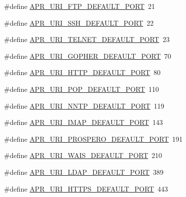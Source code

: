 \begin{DoxyCompactItemize}
\item 
\#define \hyperlink{group___a_p_r___util___u_r_i_ga0134a6dcaf62796e014c592ac4b2c09c}{A\-P\-R\-\_\-\-U\-R\-I\-\_\-\-F\-T\-P\-\_\-\-D\-E\-F\-A\-U\-L\-T\-\_\-\-P\-O\-R\-T}~21
\item 
\#define \hyperlink{group___a_p_r___util___u_r_i_ga4f4161d54207cf302b3c91cdda428be1}{A\-P\-R\-\_\-\-U\-R\-I\-\_\-\-S\-S\-H\-\_\-\-D\-E\-F\-A\-U\-L\-T\-\_\-\-P\-O\-R\-T}~22
\item 
\#define \hyperlink{group___a_p_r___util___u_r_i_ga0b6bcdfb9754edd6c160c9d6755df085}{A\-P\-R\-\_\-\-U\-R\-I\-\_\-\-T\-E\-L\-N\-E\-T\-\_\-\-D\-E\-F\-A\-U\-L\-T\-\_\-\-P\-O\-R\-T}~23
\item 
\#define \hyperlink{group___a_p_r___util___u_r_i_gaaf5bb1e53b22fa7ac4e88f415e7c2476}{A\-P\-R\-\_\-\-U\-R\-I\-\_\-\-G\-O\-P\-H\-E\-R\-\_\-\-D\-E\-F\-A\-U\-L\-T\-\_\-\-P\-O\-R\-T}~70
\item 
\#define \hyperlink{group___a_p_r___util___u_r_i_ga7a9fa7be10430864617b3a0a58dd5d12}{A\-P\-R\-\_\-\-U\-R\-I\-\_\-\-H\-T\-T\-P\-\_\-\-D\-E\-F\-A\-U\-L\-T\-\_\-\-P\-O\-R\-T}~80
\item 
\#define \hyperlink{group___a_p_r___util___u_r_i_gaf9408c6288a8580b285d7af58f836856}{A\-P\-R\-\_\-\-U\-R\-I\-\_\-\-P\-O\-P\-\_\-\-D\-E\-F\-A\-U\-L\-T\-\_\-\-P\-O\-R\-T}~110
\item 
\#define \hyperlink{group___a_p_r___util___u_r_i_ga86ac4da6cabda295f87042fb258fc36b}{A\-P\-R\-\_\-\-U\-R\-I\-\_\-\-N\-N\-T\-P\-\_\-\-D\-E\-F\-A\-U\-L\-T\-\_\-\-P\-O\-R\-T}~119
\item 
\#define \hyperlink{group___a_p_r___util___u_r_i_ga6e8aade3786adb75dc63b9d0bd3bfbb9}{A\-P\-R\-\_\-\-U\-R\-I\-\_\-\-I\-M\-A\-P\-\_\-\-D\-E\-F\-A\-U\-L\-T\-\_\-\-P\-O\-R\-T}~143
\item 
\#define \hyperlink{group___a_p_r___util___u_r_i_ga329c26e04dd9449fd565f8ba76e8666c}{A\-P\-R\-\_\-\-U\-R\-I\-\_\-\-P\-R\-O\-S\-P\-E\-R\-O\-\_\-\-D\-E\-F\-A\-U\-L\-T\-\_\-\-P\-O\-R\-T}~191
\item 
\#define \hyperlink{group___a_p_r___util___u_r_i_ga0807570c6ef5c3813f65915fb0c19ff2}{A\-P\-R\-\_\-\-U\-R\-I\-\_\-\-W\-A\-I\-S\-\_\-\-D\-E\-F\-A\-U\-L\-T\-\_\-\-P\-O\-R\-T}~210
\item 
\#define \hyperlink{group___a_p_r___util___u_r_i_ga5c648234ed92d19a09232080779a0185}{A\-P\-R\-\_\-\-U\-R\-I\-\_\-\-L\-D\-A\-P\-\_\-\-D\-E\-F\-A\-U\-L\-T\-\_\-\-P\-O\-R\-T}~389
\item 
\#define \hyperlink{group___a_p_r___util___u_r_i_ga9b319ff3bda42c0384fcfe0a2bc53254}{A\-P\-R\-\_\-\-U\-R\-I\-\_\-\-H\-T\-T\-P\-S\-\_\-\-D\-E\-F\-A\-U\-L\-T\-\_\-\-P\-O\-R\-T}~443

\end{DoxyCompactItemize}
